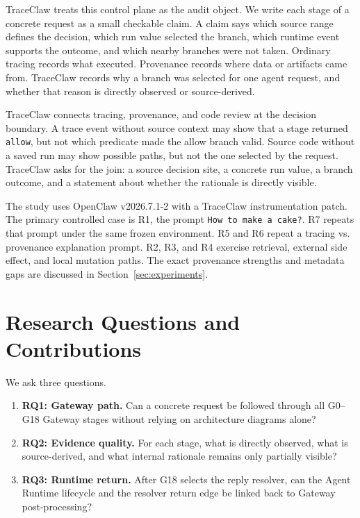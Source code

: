 \documentclass[11pt,a4paper]{article}
\begin{document}
TraceClaw treats this control plane as the audit object. We write each
stage of a concrete request as a small checkable claim. A claim says
which source range defines the decision, which run value selected the
branch, which runtime event supports the outcome, and which nearby
branches were not taken. Ordinary tracing records what executed.
Provenance records where data or artifacts came from. TraceClaw records
why a branch was selected for one agent request, and whether that reason
is directly observed or source-derived.

TraceClaw connects tracing, provenance, and code review at the decision
boundary. A trace event without source context may show that a stage
returned \texttt{allow}, but not which predicate made the allow branch
valid. Source code without a saved run may show possible paths, but not
the one selected by the request. TraceClaw asks for the join: a source
decision site, a concrete run value, a branch outcome, and a statement
about whether the rationale is directly visible.

The study uses OpenClaw v2026.7.1-2 with a TraceClaw instrumentation
patch. The primary controlled case is R1, the prompt \texttt{How to make
a cake?}. R7 repeats that prompt under the same frozen environment. R5
and R6 repeat a tracing vs. provenance explanation prompt. R2, R3, and R4
exercise retrieval, external side effect, and local mutation paths. The
exact provenance strengths and metadata gaps are discussed in
Section~\ref{sec:experiments}.

\section{Research Questions and Contributions}
\label{sec:questions-contributions}

We ask three questions.

\begin{enumerate}
    \item \textbf{RQ1: Gateway path.} Can a concrete request be followed
    through all G0--G18 Gateway stages without relying on architecture
    diagrams alone?

    \item \textbf{RQ2: Evidence quality.} For each stage, what is
    directly observed, what is source-derived, and what internal rationale
    remains only partially visible?

    \item \textbf{RQ3: Runtime return.} After G18 selects the reply
    resolver, can the Agent Runtime lifecycle and the resolver return edge
    be linked back to Gateway post-processing?
\end{enumerate}
\end{document}
